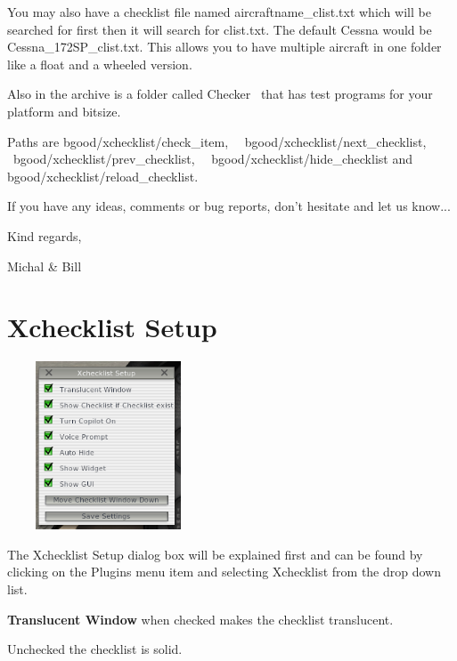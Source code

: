 \documentclass[11pt,parskip=half,a4paper]{scrartcl}
\begin{document}
You may also have a checklist file named aircraftname\_clist.txt which will be searched for first then it will search for clist.txt. The default Cessna would be Cessna\_172SP\_clist.txt. This allows you to have multiple aircraft in one folder like a float and a wheeled version. \newline

Also in the archive is a folder called Checker \ that has test programs for your platform and bitsize. \newline

Paths are bgood/xchecklist/check\_item, \ \ bgood/xchecklist/next\_checklist, \ bgood/xchecklist/prev\_checklist, \ \ bgood/xchecklist/hide\_checklist and bgood/xchecklist/reload\_checklist. \newline

If you have any ideas, comments or bug reports, don't hesitate and let us know... \newline

Kind regards, \newline

Michal \& Bill \newline

\newpage
\section{Xchecklist Setup}

\begin{center}
\includegraphics[width=6cm, height=5cm]{XchecklistSetup.png}
\end{center}


The {\textquotedbl}Xchecklist Setup{\textquotedbl} dialog box will be explained first and can be found by clicking on the Plugins menu item and selecting Xchecklist from the drop down list. 

\textbf{Translucent Window} when checked makes the checklist translucent.

Unchecked the checklist is solid. \newline
\end{document}
